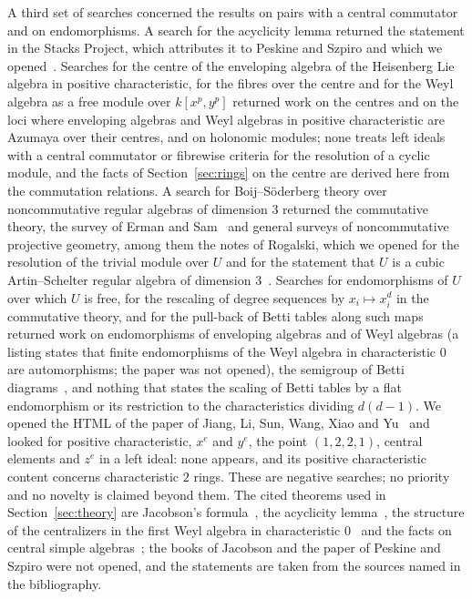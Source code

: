 \documentclass[11pt]{article}
\theoremstyle{definition}
\theoremstyle{remark}
\begin{document}
A third set of searches concerned the results on pairs with a central commutator and on endomorphisms. A search for the acyclicity lemma returned the statement in the Stacks Project, which attributes it to Peskine and Szpiro and which we opened~\cite{Stacks,PS73}. Searches for the centre of the enveloping algebra of the Heisenberg Lie algebra in positive characteristic, for the fibres over the centre and for the Weyl algebra as a free module over $k[x^p,y^p]$ returned work on the centres and on the loci where enveloping algebras and Weyl algebras in positive characteristic are Azumaya over their centres, and on holonomic modules; none treats left ideals with a central commutator or fibrewise criteria for the resolution of a cyclic module, and the facts of Section~\ref{sec:rings} on the centre are derived here from the commutation relations. A search for Boij--S\"oderberg theory over noncommutative regular algebras of dimension $3$ returned the commutative theory, the survey of Erman and Sam~\cite{ES16} and general surveys of noncommutative projective geometry, among them the notes of Rogalski, which we opened for the resolution of the trivial module over $U$ and for the statement that $U$ is a cubic Artin--Schelter regular algebra of dimension $3$~\cite{Rogalski}. Searches for endomorphisms of $U$ over which $U$ is free, for the rescaling of degree sequences by $x_i\mapsto x_i^d$ in the commutative theory, and for the pull-back of Betti tables along such maps returned work on endomorphisms of enveloping algebras and of Weyl algebras (a listing states that finite endomorphisms of the Weyl algebra in characteristic $0$ are automorphisms; the paper was not opened), the semigroup of Betti diagrams~\cite{Erman09}, and nothing that states the scaling of Betti tables by a flat endomorphism or its restriction to the characteristics dividing $d(d-1)$. We opened the HTML of the paper of Jiang, Li, Sun, Wang, Xiao and Yu~\cite{JLSWXY} and looked for positive characteristic, $x^e$ and $y^e$, the point $(1,2,2,1)$, central elements and $z^e$ in a left ideal: none appears, and its positive characteristic content concerns characteristic $2$ rings. These are negative searches; no priority and no novelty is claimed beyond them. The cited theorems used in Section~\ref{sec:theory} are Jacobson's formula~\cite{Jacobson}, the acyclicity lemma~\cite{PS73,Stacks}, the structure of the centralizers in the first Weyl algebra in characteristic $0$~\cite{Amitsur,Dixmier} and the facts on central simple algebras~\cite{StacksCSA,StacksDCT}; the books of Jacobson and the paper of Peskine and Szpiro were not opened, and the statements are taken from the sources named in the bibliography.
\end{document}
